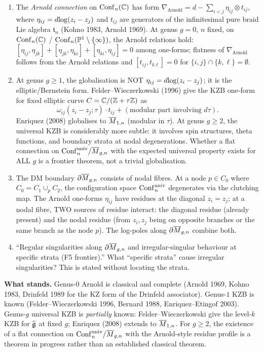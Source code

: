 \begin{enumerate}
\item[Q5.] The \emph{Arnold connection} on $\mathrm{Conf}_n(\mathbb{C})$ has form
$\nabla_{\mathrm{Arnold}} = d - \sum_{i < j} \eta_{ij} \otimes t_{ij}$,
where $\eta_{ij} = d{\log}(z_i - z_j)$ and $t_{ij}$ are generators of the
infinitesimal pure braid Lie algebra $\mathfrak{t}_n$ (Kohno 1983,
Arnold 1969). At genus $g = 0$, $n$ fixed, on
$\mathrm{Conf}_n(\mathbb{C})$ / $\mathrm{Conf}_n(\mathbb{P}^1 \setminus \{\infty\})$, the
Arnold relations hold:
$[\eta_{ij}, \eta_{jk}] + [\eta_{jk}, \eta_{ki}] + [\eta_{ki}, \eta_{ij}]
= 0$ among one-forms; flatness of $\nabla_{\mathrm{Arnold}}$ follows
from the Arnold relations and $[t_{ij}, t_{k\ell}] = 0$ for
$\{i,j\} \cap \{k,\ell\} = \emptyset$.
\item[Q6.] At genus $g \ge 1$, the globalisation is NOT $\eta_{ij} =
d{\log}(z_i - z_j)$; it is the elliptic/Bernstein form. Felder--Wieczerkowski
(1996) give the KZB one-form for fixed elliptic curve
$C = \mathbb{C} / (\mathbb{Z} + \tau \mathbb{Z})$ as
\[
\omega_{ij}(z_i - z_j; \tau) \cdot t_{ij} + (\text{modular part involving } d\tau).
\]
Enriquez (2008) globalises to $\overline{M}_{1,n}$ (modular in $\tau$). At
genus $g \ge 2$, the universal KZB is considerably more subtle: it
involves spin structures, theta functions, and boundary strata at
nodal degenerations. Whether a flat connection on $\mathrm{Conf}_n^{\mathrm{univ}}
/ \overline{M}_{g,n}$ with the expected universal property exists for ALL
$g$ is a frontier theorem, not a trivial globalisation.
\item[Q7.] The DM boundary $\partial \overline{M}_{g,n}$ consists of nodal
fibres. At a node $p \in C_0$ where $C_0 = C_1 \cup_p C_2$, the
configuration space $\mathrm{Conf}_n^{\mathrm{univ}}$ degenerates via the clutching
map. The Arnold one-forms $\eta_{ij}$ have residues at the diagonal
$z_i = z_j$; at a nodal fibre, TWO sources of residue interact: the
diagonal residue (already present) and the nodal residue (from
$z_i, z_j$ being on opposite branches or the same branch as the node
$p$). The log-poles along $\partial \overline{M}_{g,n}$ combine both.
\item[Q8.] ``Regular singularities along $\partial \overline{M}_{g,n}$ and
irregular-singular behaviour at specific strata (F5 frontier).'' What
``specific strata'' cause irregular singularities? This is stated
without locating the strata.
\end{enumerate}

\textbf{What stands.} Genus-$0$ Arnold is classical and complete
(Arnold 1969, Kohno 1983, Drinfeld 1989 for the KZ form of the
Drinfeld associator). Genus-$1$ KZB is known (Felder--Wieczerkowski
1996, Bernard 1988, Enriquez--Etingof 2003). Genus-$g$ universal KZB
is \emph{partially} known: Felder--Wieczerkowski give the level-$k$
KZB for $\widehat{\mathfrak{g}}$ at fixed $g$; Enriquez (2008) extends to
$\overline{M}_{1,n}$. For $g \ge 2$, the existence of a flat connection on
$\mathrm{Conf}_n^{\mathrm{univ}} / \overline{M}_{g,n}$ with the Arnold-style residue
profile is a theorem in progress rather than an established classical
theorem.


